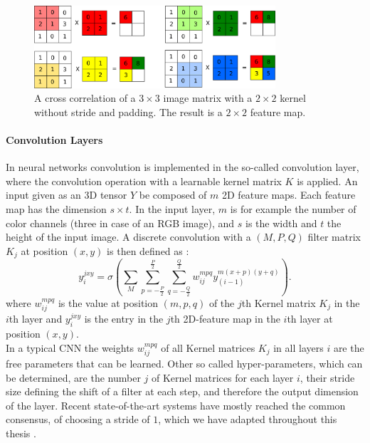 \begin{figure}
	\centering
    	\includegraphics[width=0.8\textwidth]{imgs/convolution.png} 
    \caption[A cross correlation of a $3\times3$ image matrix with a $2\times2$ kernel.]{A cross correlation of a $3\times3$ image matrix with a $2\times2$ kernel without stride and padding. The result is a $2\times2$ feature map.}
	\label{fig:conv}
\end{figure}

\paragraph{Convolution Layers} \label{c:convlayers}

In neural networks convolution is implemented in the so-called convolution layer, where the convolution operation with a learnable kernel matrix $K$ is applied. 
An input given as an 3D tensor $Y$ be composed of $m$ 2D feature maps. Each feature map has the dimension $s \times t$. 
In the input layer, $m$ is for example the number of color channels (three in case of an RGB image), and $s$ is the width and $t$ the height of the input image. 
A discrete convolution with a $(M , P , Q)$ filter matrix $K_j$ at position $(x,y)$ is then defined as : 
\[
y_{i}^{jxy} = \sigma(\sum_M \sum_{p=-\frac{P}{2}}^{\frac{P}{2}} \sum_{q=-\frac{Q}{2}}^{\frac{Q}{2}} w_{ij}^{mpq} y_{(i-1)}^{m(x+p)(y+q)}) .
\]
where $w_{ij}^{mpq}$ is the value at position $(m,p,q)$ of the $j$th Kernel matrix $K_j$ in the $i$th layer and $y_{i}^{jxy}$ is the entry in the $j$th 2D-feature map in the $i$th layer at position $(x, y)$.\\
In a typical CNN the weights $w_{ij}^{mpq}$ of all Kernel matrices $K_j$ in all layers $i$ are the free parameters that can be learned. 
Other so called hyper-parameters, which can be determined, are the number $j$ of Kernel matrices for each layer $i$, their stride size defining the shift of a filter at each step, and therefore the output dimension of the layer.
Recent state-of-the-art systems have mostly reached the common consensus, of choosing a stride of $1$, which we have adapted throughout this thesis \cite{simonyan2014very}.


